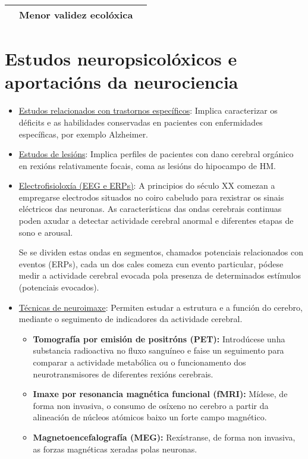 \documentclass[a4paper,11pt]{article}
\begin{document}
\begin{table}[h!]
\begin{tabular}{c|c|c|}
\multicolumn{1}{|c|}{}                                  & Menor validez ecolóxica                                                                                                    &                                                                                                                                             \\ \hline
\end{tabular}
\end{table}

\section{Estudos neuropsicolóxicos e aportacións da neurociencia}
\begin{itemize}
	\item \underline{Estudos relacionados con trastornos específicos}: Implica caracterizar os 				déficits e as habilidades conservadas en pacientes con enfermidades específicas, por exemplo 			Alzheimer.
	\item \underline{Estudos de lesións}: Implica perfiles de pacientes con dano cerebral orgánico en 	rexións relativamente focais, coma as lesións do hipocampo de HM. 
	\item \underline{Electrofisioloxía (EEG e ERPs)}: A principios do século XX comezan a empregarse 		electrodos situados no coiro cabeludo para rexistrar os sinais eléctricos das neuronas. As
	características das ondas cerebrais continuas poden axudar a detectar actividade cerebral anormal 
	e diferentes etapas de sono e arousal.
	
	Se se dividen estas ondas en segmentos, chamados potenciais relacionados con eventos (ERPs), cada 
	un dos cales comeza cun evento particular, pódese medir a actividade cerebral evocada pola
	presenza de determinados estímulos (potenciais evocados). 
	\item \underline{Técnicas de neuroimaxe}: Permiten estudar a estrutura e a función do cerebro,
	mediante o seguimento de indicadores da actividade cerebral.
	\begin{itemize}
		\item \textbf{Tomografía por emisión de positróns (PET):} Introdúcese unha substancia
		radioactiva no fluxo sanguíneo e faise un seguimento para comparar a actividade metabólica ou 
		o funcionamento dos neurotransmisores de diferentes rexións cerebrais.
		\item \textbf{Imaxe por resonancia magnética funcional (fMRI):} Mídese, de forma non
		invasiva, o consumo de osíxeno no cerebro a partir da alineación de núcleos atómicos baixo un 
		forte campo magnético. 
		\item \textbf{Magnetoencefalografía (MEG):} Rexístranse, de forma non invasiva, as forzas
		magnéticas xeradas polas neuronas. 
	\end{itemize}
\end{itemize}
\end{document}
